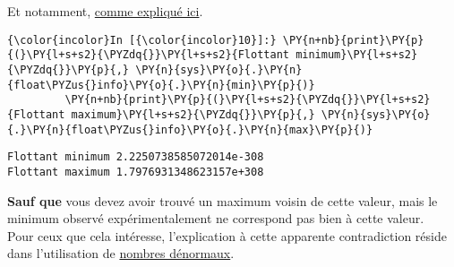     Et notamment,
\href{https://docs.python.org/3/library/sys.html\#sys.float_info}{comme
expliqué ici}.

    \begin{Verbatim}[commandchars=\\\{\}]
{\color{incolor}In [{\color{incolor}10}]:} \PY{n+nb}{print}\PY{p}{(}\PY{l+s+s2}{\PYZdq{}}\PY{l+s+s2}{Flottant minimum}\PY{l+s+s2}{\PYZdq{}}\PY{p}{,} \PY{n}{sys}\PY{o}{.}\PY{n}{float\PYZus{}info}\PY{o}{.}\PY{n}{min}\PY{p}{)}
         \PY{n+nb}{print}\PY{p}{(}\PY{l+s+s2}{\PYZdq{}}\PY{l+s+s2}{Flottant maximum}\PY{l+s+s2}{\PYZdq{}}\PY{p}{,} \PY{n}{sys}\PY{o}{.}\PY{n}{float\PYZus{}info}\PY{o}{.}\PY{n}{max}\PY{p}{)}
\end{Verbatim}


    \begin{Verbatim}[commandchars=\\\{\}]
Flottant minimum 2.2250738585072014e-308
Flottant maximum 1.7976931348623157e+308

    \end{Verbatim}

    \textbf{Sauf que} vous devez avoir trouvé un maximum voisin de cette
valeur, mais le minimum observé expérimentalement ne correspond pas bien
à cette valeur.\\

Pour ceux que cela intéresse, l'explication à cette apparente
contradiction réside dans l'utilisation de
\href{http://en.wikipedia.org/wiki/Denormal\%5Fnumber}{nombres
dénormaux}.
